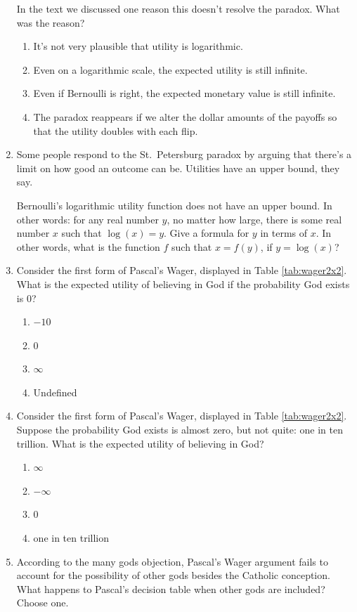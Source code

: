 \documentclass[justified]{tufte-book}
\providecommand{\tightlist}{%
  \setlength{\itemsep}{0pt}\setlength{\parskip}{0pt}}
\theoremstyle{definition}
\theoremstyle{definition}
\theoremstyle{definition}
\theoremstyle{definition}
\theoremstyle{remark}
\begin{document}
\begin{enumerate}
  In the text we discussed one reason this doesn't resolve the paradox. What was the reason?

  \begin{enumerate}
  \def\labelenumii{\alph{enumii}.}
  \tightlist
  \item
    It's not very plausible that utility is logarithmic.
  \item
    Even on a logarithmic scale, the expected utility is still infinite.
  \item
    Even if Bernoulli is right, the expected monetary value is still infinite.
  \item
    The paradox reappears if we alter the dollar amounts of the payoffs so that the utility doubles with each flip.
  \end{enumerate}
\item
  Some people respond to the St.~Petersburg paradox by arguing that there's a limit on how good an outcome can be. Utilities have an upper bound, they say.

  Bernoulli's logarithmic utility function does not have an upper bound. In other words: for any real number \(y\), no matter how large, there is some real number \(x\) such that \(\log(x) = y\). Give a formula for \(y\) in terms of \(x\). In other words, what is the function \(f\) such that \(x = f(y)\), if \(y = \log(x)\)?
\item
  Consider the first form of Pascal's Wager, displayed in Table \ref{tab:wager2x2}. What is the expected utility of believing in God if the probability God exists is \(0\)?

  \begin{enumerate}
  \def\labelenumii{\alph{enumii}.}
  \tightlist
  \item
    \(-10\)
  \item
    \(0\)
  \item
    \(\infty\)
  \item
    Undefined
  \end{enumerate}
\item
  Consider the first form of Pascal's Wager, displayed in Table \ref{tab:wager2x2}. Suppose the probability God exists is almost zero, but not quite: one in ten trillion. What is the expected utility of believing in God?

  \begin{enumerate}
  \def\labelenumii{\alph{enumii}.}
  \tightlist
  \item
    \(\infty\)
  \item
    \(-\infty\)
  \item
    \(0\)
  \item
    one in ten trillion
  \end{enumerate}
\item
  According to the many gods objection, Pascal's Wager argument fails to account for the possibility of other gods besides the Catholic conception. What happens to Pascal's decision table when other gods are included? Choose one.


\end{enumerate}
\end{document}

